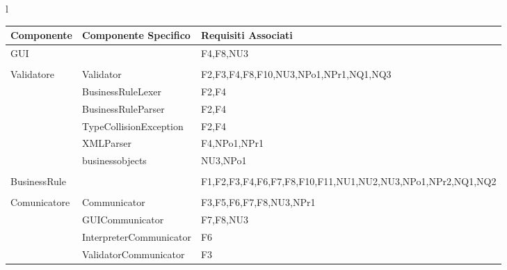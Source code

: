 \documentclass[11pt,titlepage,a4paper]{report}
\begin{document}
\begin{center}
\begin{table}[hbtp]
\large{
\begin{tabular}{l}
\begin{tabular}{||p{3cm}||p{5cm}||p{6cm}||} \hline
\textbf{Componente} & \textbf{Componente Specifico} & \textbf{Requisiti Associati} \\ \hline

GUI & & F4,F8,NU3\\ \hline
 &  & \\ \hline

Validatore & Validator & F2,F3,F4,F8,F10,NU3,NPo1,NPr1,NQ1,NQ3\\ \hline
 & BusinessRuleLexer &F2,F4 \\ \hline
 & BusinessRuleParser & F2,F4 \\ \hline
 & TypeCollisionException & F2,F4\\ \hline
 & XMLParser & F4,NPo1,NPr1\\ \hline
 & businessobjects & NU3,NPo1\\ \hline
 &  & \\ \hline

BusinessRule & & F1,F2,F3,F4,F6,F7,F8,F10,F11,NU1,NU2,NU3,NPo1,NPr2,NQ1,NQ2\\ \hline
 &  & \\ \hline

Comunicatore & Communicator & F3,F5,F6,F7,F8,NU3,NPr1\\ \hline
 & GUICommunicator & F7,F8,NU3\\ \hline
 & InterpreterCommunicator & F6\\ \hline
 & ValidatorCommunicator & F3\\ \hline


\end{tabular} \\
\end{tabular}

}
\end{table}
\end{center}
\end{document}
